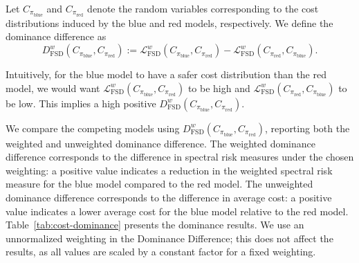 Let $C_{\pi_{\textrm{blue}}}$ and $C_{\pi_{\textrm{red}}}$ denote the random variables corresponding to the cost distributions induced by the blue and red models, respectively. We define the dominance difference as
\[
  D_{\textrm{FSD}}^{w}(C_{\pi_{\textrm{blue}}}, C_{\pi_{\textrm{red}}}) :=
  \mathcal{L}_{\textrm{FSD}}^{w}(C_{\pi_{\textrm{blue}}}, C_{\pi_{\textrm{red}}})
  - \mathcal{L}_{\textrm{FSD}}^{w}(C_{\pi_{\textrm{red}}}, C_{\pi_{\textrm{blue}}}).
\]

Intuitively, for the blue model to have a safer cost distribution than the red model, we would want
$\mathcal{L}_{\textrm{FSD}}^{w}(C_{\pi_{\textrm{blue}}}, C_{\pi_{\textrm{red}}})$ to be high and
$\mathcal{L}_{\textrm{FSD}}^{w}(C_{\pi_{\textrm{red}}}, C_{\pi_{\textrm{blue}}})$ to be low.
This implies a high positive $D_{\textrm{FSD}}^{w}(C_{\pi_{\textrm{blue}}}, C_{\pi_{\textrm{red}}})$.

We compare the competing models using $D_{\textrm{FSD}}^{w}(C_{\pi_{\textrm{blue}}}, C_{\pi_{\textrm{red}}})$, reporting both the weighted and unweighted dominance difference. The weighted dominance difference corresponds to the difference in spectral risk measures under the chosen weighting: a positive value indicates a reduction in the weighted spectral risk measure for the blue model compared to the red model. The unweighted dominance difference corresponds to the difference in average cost: a positive value indicates a lower average cost for the blue model relative to the red model. Table~\ref{tab:cost-dominance} presents the dominance results.
We use an unnormalized weighting in the Dominance Difference; this does not affect the results, as all values are scaled by a constant factor for a fixed weighting.


